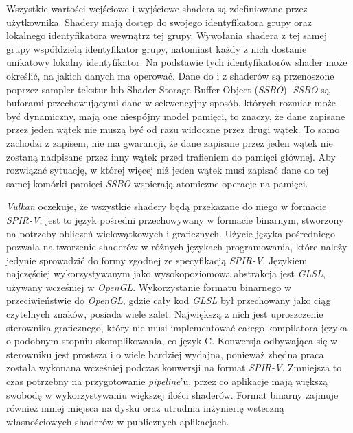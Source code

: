 Wszystkie wartości wejściowe i wyjściowe shadera są zdefiniowane przez użytkownika.
Shadery mają dostęp do swojego identyfikatora grupy oraz lokalnego identyfikatora wewnątrz tej grupy.
Wywołania shadera z tej samej grupy współdzielą identyfikator grupy, natomiast każdy z nich dostanie unikatowy lokalny identyfikator.
Na podstawie tych identyfikatorów shader może określić, na jakich danych ma operować.
Dane do i z shaderów są przenoszone poprzez sampler tekstur lub Shader Storage Buffer Object (\textit{SSBO}).
\textit{SSBO} są buforami przechowującymi dane w sekwencyjny sposób, których rozmiar może być dynamiczny, mają one niespójny model pamięci, to znaczy, że dane zapisane przez jeden wątek nie muszą być od razu widoczne przez drugi wątek.
To samo zachodzi z zapisem, nie ma gwarancji, że dane zapisane przez jeden wątek nie zostaną nadpisane przez inny wątek przed trafieniem do pamięci głównej.  
Aby rozwiązać sytuację, w której więcej niż jeden wątek musi zapisać dane do tej samej komórki pamięci \textit{SSBO} wspierają atomiczne operacje na pamięci.

\textit{Vulkan} oczekuje, że wszystkie shadery będą przekazane do niego w formacie \textit{SPIR-V}\cite{SPIRVSpec}, jest to język pośredni przechowywany w formacie binarnym, stworzony na potrzeby obliczeń wielowątkowych i graficznych.
Użycie języka pośredniego pozwala na tworzenie shaderów w różnych językach programowania, które należy jedynie sprowadzić do formy zgodnej ze specyfikacją \textit{SPIR-V}.
Językiem najczęściej wykorzystywanym jako wysokopoziomowa abstrakcja jest \textit{GLSL}, używany wcześniej w \textit{OpenGL}.
Wykorzystanie formatu binarnego w przeciwieństwie do \textit{OpenGL}, gdzie cały kod \textit{GLSL} był przechowany jako ciąg czytelnych znaków, posiada wiele zalet.
Największą z nich jest uproszczenie sterownika graficznego, który nie musi implementować całego kompilatora języka o podobnym stopniu skomplikowania, co język C.
Konwersja odbywająca się w sterowniku jest prostsza i o wiele bardziej wydajna, ponieważ zbędna praca została wykonana wcześniej podczas konwersji na format \textit{SPIR-V}.
Zmniejsza to czas potrzebny na przygotowanie \textit{pipeline}'u, przez co aplikacje mają większą swobodę w wykorzystywaniu większej ilości shaderów.
Format binarny zajmuje również mniej miejsca na dysku oraz utrudnia inżynierię wsteczną własnościowych shaderów w publicznych aplikacjach.